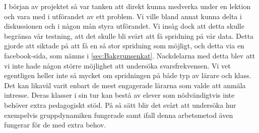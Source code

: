 
\textcolor{Mahogany}{
    I början av projektet så var tanken att direkt kunna medverka under en lektion och vara med i utförandet av ett problem. Vi ville bland annat kunna delta i diskussionen och i någon mån styra utförandet. Vi insåg dock att detta skulle begränsa vår testning, att det skulle bli svårt att få spridning på vår data.
    Detta gjorde att siktade på att få en så stor spridning som möjligt, och detta via en facebook-sida, som nämns i \ref{sec:Bakgrunsenkat}. Nackdelarna med detta blev
    \todo{!}
    att vi inte hade någon större möjlighet att undersöka svarsfrekvensen. Vi vet egentligen heller inte så mycket om spridningen på både typ av lärare och klass. Det kan likaväl varit enbart de mest engagerade lärarna som valde att anmäla intresse. Deras klasser i sin tur kan bestå av elever som nödvändigtvis inte behöver extra pedagogiskt stöd. På så sätt blir det svårt att undersöka hur exempelvis gruppdynamiken fungerade samt ifall denna arbetsmetod även fungerar för de med extra behov.
}